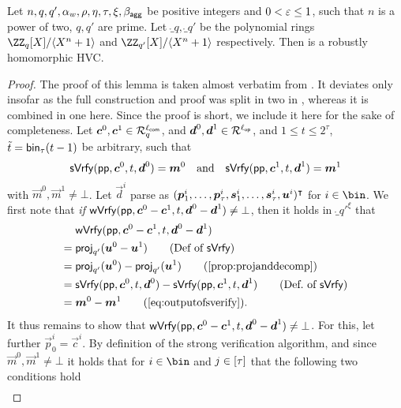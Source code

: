 \begin{lemma}\label{lem:hvcrobhom}
  Let $n,q,q',\alpha_w,\rho,\eta,\tau,\xi,\beta_{\mathsf{agg}}$ be positive integers and $0<\varepsilon\leq 1$, such that $n$ is a power of two, $q,q'$ are prime.
  Let $\ring_q,\ring_{q'}$ be the polynomial rings $\defringq$ and $\defringqq$ respectively.
  Then \eprint{$\hvcplain$}\cameraready{$\hvccamera$} is a robustly homomorphic HVC.
\end{lemma}
\begin{proof}
The proof of this lemma is taken almost verbatim from \cite{CCS:FleSimZha22}.
It deviates only insofar as the full construction and proof was split in two in \cite{CCS:FleSimZha22}, whereas it is combined in one here.
Since the proof is short, we include it here for the sake of completeness. %
Let $\boldsymbol{c}^0,\boldsymbol{c}^1 \in \mathcal{R}_q^{\ell_{\mathsf{com}}}$, and $\boldsymbol{d}^0, \boldsymbol{d}^1 \in \mathcal{R}^{\ell_{\mathsf{op}}}$, and 
$1\leq t \leq 2^\tau$, $\tilde{t} = \mathsf{bin}_{\tau}(t-1)$
be arbitrary, such that
\begin{equation}
    \mathsf{sVrfy}(\mathsf{pp},\boldsymbol{c}^0, t,\boldsymbol{d}^0)=\boldsymbol{m}^0 \quad \text{and} \quad \mathsf{sVrfy}(\mathsf{pp},\boldsymbol{c}^1, t,\boldsymbol{d}^1)=\boldsymbol{m}^1\label{eq:outputofsverify}
\end{equation}
with $\vec{m}^0,\vec{m}^1\neq \bot$.
Let $\vec{d}^i$ parse as $(\boldsymbol{p}^i_1,\dots,\boldsymbol{p}^i_{\tau},\boldsymbol{s}^i_1, \dots, \boldsymbol{s}^i_{\tau},\boldsymbol{u}^i)^\intercal$ for $i\in\bin$.
We first note that \emph{if} $\mathsf{wVrfy}(\mathsf{pp},\boldsymbol{c}^0-\boldsymbol{c}^1, t,\boldsymbol{d}^0-\boldsymbol{d}^1)\neq\bot$, then it holds in $\ring_{q'}^\xi$ that
\begin{align*}
  &\wverify(\params,\vec{c}^0-\vec{c}^1, t,\vec{d}^0-\vec{d}^1)\\
  ={}&\projmod{q'}(\vec{u}^0-\vec{u}^1)\tag{Def of $\sverify$}\\
  ={}&\projmod{q'}(\vec{u}^0)-\projmod{q'}(\vec{u}^1)\tag{\autoref{prop:projanddecomp}}\\
  ={}&\sverify(\params,\vec{c}^0, t,\vec{d}^0)-\sverify(\params,\vec{c}^1, t,\vec{d}^1)\tag{Def.\ of $\sverify$}\\
  ={}&\vec{m}^0- \vec{m}^1 \tag{\autoref{eq:outputofsverify}}.
\end{align*}
%
It thus remains to show that $\mathsf{wVrfy}(\mathsf{pp},\boldsymbol{c}^0-\boldsymbol{c}^1, t,\boldsymbol{d}^0-\boldsymbol{d}^1)\neq\bot$.
For this, let further $\vec{p}^i_0 = \vec{c}^i$.
By definition of the strong verification algorithm, and since $\vec{m}^0,\vec{m}^1\neq\bot$ it holds that for $i\in\bin$ 
and $j \in [\tau]$ that the following two conditions hold
\begin{align}

\end{align}
\end{proof}
